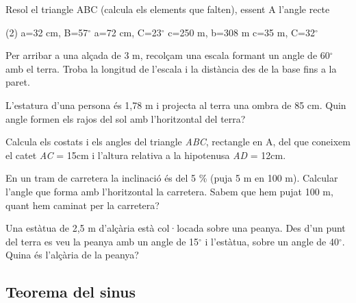 \begin{mylist}
	
	\exer[1] Resol el triangle ABC (calcula els elements que falten), essent A l'angle recte
	\begin{tasks}(2)
		\task a=32 cm, B=57$^\circ$
		\task a=72 cm, C=23$^\circ$
		\task c=250 m, b=308 m
		\task c=35 m, C=32$^\circ$
	\end{tasks}
	\answers[cols=1]{[$\hat C=33$; $b=26,8$; $c=17,4$,  $\hat B=67$; $b=66,3$; $c=28,1$,  $\hat C=39$; $\hat B=51$; $a=396,7$,  $\hat B=58$; $b=56,01$; $a=66,05$]}
	
	\exer[1] Per arribar a una alçada de 3 m, recolçam una escala formant un angle de 60$^\circ$ amb el terra. Troba la longitud de l'escala i la distància des de la base fins a la paret.
	
	\exer[1] L'estatura d'una persona és 1,78 m i projecta al terra una ombra de 85 cm. Quin angle formen els rajos del sol amb l'horitzontal del terra?
	
	\exer[1]
	Calcula els costats i els angles del triangle \emph{ABC}, rectangle en
	A, del que coneixem el catet \emph{AC} = 15cm i l'altura relativa a
	la hipotenusa \emph{AD} = 12cm.
	
 
	\exer
	En un tram de carretera la inclinació és del 5 \% (puja 5 m en 100 m).
	Calcular l'angle que forma amb l'horitzontal la carretera. Sabem que
	hem pujat 100 m, quant hem caminat per la carretera?
	
	
	\exer \spicy[1] Una estàtua de 2,5 m d'alçària està col·locada sobre una peanya. Des d'un punt del terra es veu la peanya amb un angle de 15$^\circ$ i l'estàtua, sobre un angle de 40$^\circ$. Quina és l'alçària de la peanya?
\end{mylist}

\subsection{Teorema del sinus}

